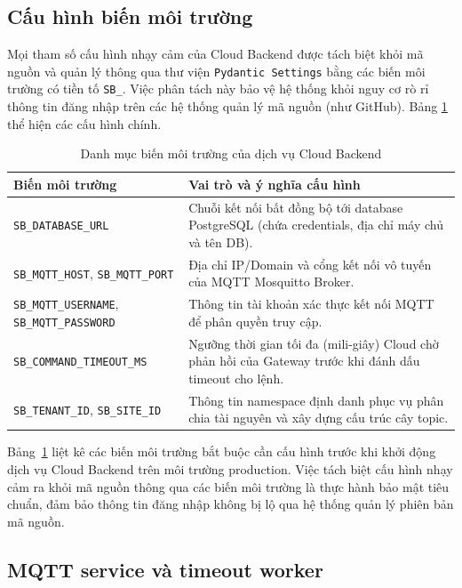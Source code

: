 \subsection{Cấu hình biến môi trường}
\label{sec:ch4-env}

Mọi tham số cấu hình nhạy cảm của Cloud Backend được tách biệt khỏi mã nguồn và quản lý thông qua thư viện \texttt{Pydantic Settings} bằng các biến môi trường có tiền tố \texttt{SB\_}. Việc phân tách này bảo vệ hệ thống khỏi nguy cơ rò rỉ thông tin đăng nhập trên các hệ thống quản lý mã nguồn (như GitHub). Bảng \ref{tab:ch4-env} thể hiện các cấu hình chính.

\begin{table}[H]
\centering
\caption{Danh mục biến môi trường của dịch vụ Cloud Backend}
\label{tab:ch4-env}
\footnotesize
\begin{tabular}{|p{4.2cm}|p{9.8cm}|}
\hline
\textbf{Biến môi trường} & \textbf{Vai trò và ý nghĩa cấu hình} \\ \hline
\texttt{SB\_DATABASE\_URL} & Chuỗi kết nối bất đồng bộ tới database PostgreSQL (chứa credentials, địa chỉ máy chủ và tên DB). \\ \hline
\texttt{SB\_MQTT\_HOST}, \texttt{SB\_MQTT\_PORT} & Địa chỉ IP/Domain và cổng kết nối vô tuyến của MQTT Mosquitto Broker. \\ \hline
\texttt{SB\_MQTT\_USERNAME}, \texttt{SB\_MQTT\_PASSWORD} & Thông tin tài khoản xác thực kết nối MQTT để phân quyền truy cập. \\ \hline
\texttt{SB\_COMMAND\_TIMEOUT\_MS} & Ngưỡng thời gian tối đa (mili-giây) Cloud chờ phản hồi của Gateway trước khi đánh dấu timeout cho lệnh. \\ \hline
\texttt{SB\_TENANT\_ID}, \texttt{SB\_SITE\_ID} & Thông tin namespace định danh phục vụ phân chia tài nguyên và xây dựng cấu trúc cây topic. \\ \hline
\end{tabular}
\end{table}

Bảng~\ref{tab:ch4-env} liệt kê các biến môi trường bắt buộc cần cấu hình trước khi khởi động dịch vụ Cloud Backend trên môi trường production. Việc tách biệt cấu hình nhạy cảm ra khỏi mã nguồn thông qua các biến môi trường là thực hành bảo mật tiêu chuẩn, đảm bảo thông tin đăng nhập không bị lộ qua hệ thống quản lý phiên bản mã nguồn.

\subsection{MQTT service và timeout worker}
\label{sec:ch4-sync-impl}

